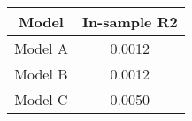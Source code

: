 \begin{tabular}{cc}
\hline
  Model  &  In-sample R2  \\
\hline
 Model A &     0.0012     \\
 Model B &     0.0012     \\
 Model C &     0.0050     \\
\hline
\end{tabular}
